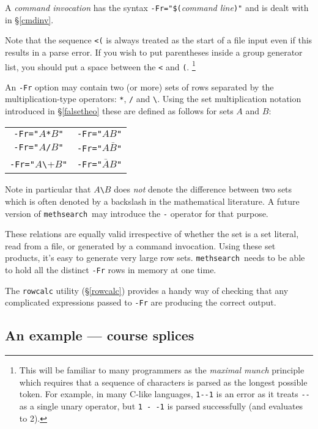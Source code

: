 \documentclass[a4paper,11pt,oneside]{book}
\makeatletter
\def\textitidx#1{\textit{#1}\index{#1}}
\newcommand{\ttcmdidx}[1]{\texttt{#1}\index{#1@{\texttt{#1}}}}
\def\methsearch{\texttt{meth\-search}}
\newcommand{\sref}[1]{\hyperref[#1]{\S\ref{#1}}}
\makeatother
\begin{document}
A \textit{command invocation} has the syntax 
\verb+-Fr="$(+\textit{command line}\verb+)"+ and is dealt with
in \sref{cmdinv}.

Note that the sequence \verb+<(+ is always treated as the start of a file
input even if this results in a parse error.  
If you wish to put parentheses inside a group generator list, 
you should put a space between the \verb+<+ and \verb+(+.%
\footnote{This will be familiar to many programmers as the 
\textitidx{maximal munch} principle which requires that a sequence of 
characters is parsed as the longest possible token.  For example, in many 
C-like languages, \verb+1--1+ is an error as it treats \verb+--+ as a single
unary operator, but \verb+1 - -1+ is parsed successfully (and evaluates to 2).}

An \verb+-Fr+ option may contain two (or more) sets of rows separated by
the multiplica\-tion-type operators: \verb+*+, \verb+/+ and \verb+\+.  Using
the set multiplication notation introduced in \sref{falsetheo} these are
defined as follows for sets $A$ and $B$:

\begin{tabular}{c@{$\quad\iff\quad$}c}
\verb+-Fr="+$A$\verb+*+$B$\verb+"+  &  \verb+-Fr="+$A B$\verb+"+ \\
\verb+-Fr="+$A$\verb+/+$B$\verb+"+  &  \verb+-Fr="+$A \bar{B}$\verb+"+ \\
\verb+-Fr="+$A$\verb+\+$B$\verb+"+  &  \verb+-Fr="+$\bar{A} B$\verb+"+ \\
\end{tabular}

Note in particular that $A$\verb+\+$B$ does \textit{not} denote the difference
between two sets which is often denoted by a backslash in the mathematical
literature.  
A future version of \methsearch\ may introduce the \verb+-+ operator for
that purpose.

These relations are equally valid irrespective of whether the set is a 
set literal, read from a file, or generated by a command invocation.
Using these set products, it's easy to generate very large row sets.  
\methsearch\ needs to be able to hold all the distinct \verb+-Fr+ rows 
in memory at one time.

The \ttcmdidx{rowcalc} utility (\sref{rowcalc}) provides a handy way 
of checking that any complicated expressions passed to \verb+-Fr+
are producing the correct output.

\subsection{An example — course splices}
\end{document}
